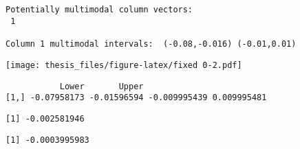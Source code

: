 \documentclass[12pt,twoside]{dukestatscithesis}
\theoremstyle{definition}
\theoremstyle{definition}
\theoremstyle{definition}
\theoremstyle{remark}
\begin{document}
\begin{Shaded}
\begin{Highlighting}[]
\OperatorTok{$}\OperatorTok{$}\OperatorTok{$}
\end{Highlighting}
\end{Shaded}
\begin{verbatim}


Potentially multimodal column vectors:
 1 

Column 1 multimodal intervals:  (-0.08,-0.016) (-0.01,0.01) 
\end{verbatim}
\texttt{[image: thesis\_files/figure-latex/fixed 0-2.pdf]}
\begin{verbatim}
           Lower       Upper                         
[1,] -0.07958173 -0.01596594 -0.009995439 0.009995481
\end{verbatim}
\begin{Shaded}
\begin{Highlighting}[]
\OperatorTok{$}\OperatorTok{$}\OperatorTok{$}
\end{Highlighting}
\end{Shaded}
\begin{verbatim}
[1] -0.002581946
\end{verbatim}
\begin{Shaded}
\begin{Highlighting}[]
\OperatorTok{$}\OperatorTok{$}\OperatorTok{$}
\end{Highlighting}
\end{Shaded}
\begin{verbatim}
[1] -0.0003995983
\end{verbatim}
\begin{Shaded}
\begin{Highlighting}[]
\OperatorTok{$}\OperatorTok{$}\OperatorTok{$}
\OperatorTok{$}\OperatorTok{$}\OperatorTok{$}\NormalTok{)}
\end{Highlighting}
\end{Shaded}
\end{document}
